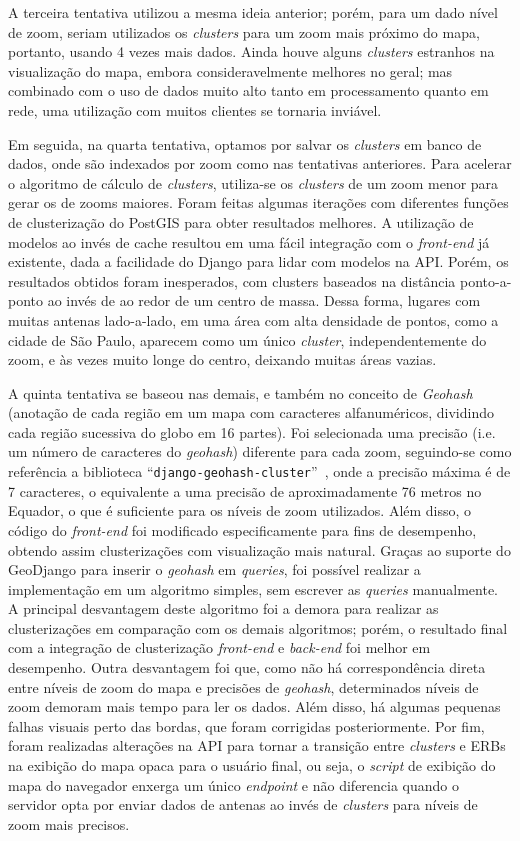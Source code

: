 \documentclass[]{politex}
\begin{document}
A terceira tentativa utilizou a mesma ideia anterior; porém, para um dado nível
de zoom, seriam utilizados os \textit{clusters} para um zoom mais próximo do
mapa, portanto, usando 4 vezes mais dados. Ainda houve alguns \textit{clusters}
estranhos na visualização do mapa, embora consideravelmente melhores no geral;
mas combinado com o uso de dados muito alto tanto em processamento quanto em
rede, uma utilização com muitos clientes se tornaria inviável.

Em seguida, na quarta tentativa, optamos por salvar os \textit{clusters} em
banco de dados, onde são indexados por zoom como nas tentativas anteriores. Para
acelerar o algoritmo de cálculo de \textit{clusters}, utiliza-se os
\textit{clusters} de um zoom menor para gerar os de zooms maiores. Foram feitas
algumas iterações com diferentes funções de clusterização do PostGIS para obter
resultados melhores. A utilização de modelos ao invés de cache resultou em uma
fácil integração com o \textit{front-end} já existente, dada a facilidade do
Django para lidar com modelos na API. Porém, os resultados obtidos foram
inesperados, com clusters baseados na distância ponto-a-ponto ao invés de ao
redor de um centro de massa. Dessa forma, lugares com muitas antenas
lado-a-lado, em uma área com alta densidade de pontos, como a cidade de São
Paulo, aparecem como um único \textit{cluster}, independentemente do zoom, e às
vezes muito longe do centro, deixando muitas áreas vazias.

A quinta tentativa se baseou nas demais, e também no conceito de
\textit{Geohash} (anotação de cada região em um mapa com caracteres
alfanuméricos, dividindo cada região sucessiva do globo em 16 partes). Foi
selecionada uma precisão (i.e. um número de caracteres do \textit{geohash})
diferente para cada zoom, seguindo-se como referência a biblioteca
``\texttt{django-geohash-cluster}''~\cite{geohashcluster}, onde a precisão
máxima é de 7 caracteres, o equivalente a uma precisão de aproximadamente 76
metros no Equador, o que é suficiente para os níveis de zoom utilizados. Além
disso, o código do \textit{front-end} foi modificado especificamente para fins
de desempenho, obtendo assim clusterizações com visualização mais natural.
Graças ao suporte do GeoDjango para inserir o \textit{geohash} em
\textit{queries}, foi possível realizar a implementação em um algoritmo simples,
sem escrever as \textit{queries} manualmente. A principal desvantagem deste
algoritmo foi a demora para realizar as clusterizações em comparação com os
demais algoritmos; porém, o resultado final com a integração de clusterização
\textit{front-end} e \textit{back-end} foi melhor em desempenho. Outra
desvantagem foi que, como não há correspondência direta entre níveis de zoom do
mapa e precisões de \textit{geohash}, determinados níveis de zoom demoram mais
tempo para ler os dados. Além disso, há algumas pequenas falhas visuais perto
das bordas, que foram corrigidas posteriormente. Por fim, foram realizadas
alterações na API para tornar a transição entre \textit{clusters} e ERBs na
exibição do mapa opaca para o usuário final, ou seja, o \textit{script} de
exibição do mapa do navegador enxerga um único \textit{endpoint} e não
diferencia quando o servidor opta por enviar dados de antenas ao invés de
\textit{clusters} para níveis de zoom mais precisos.
\end{document}
